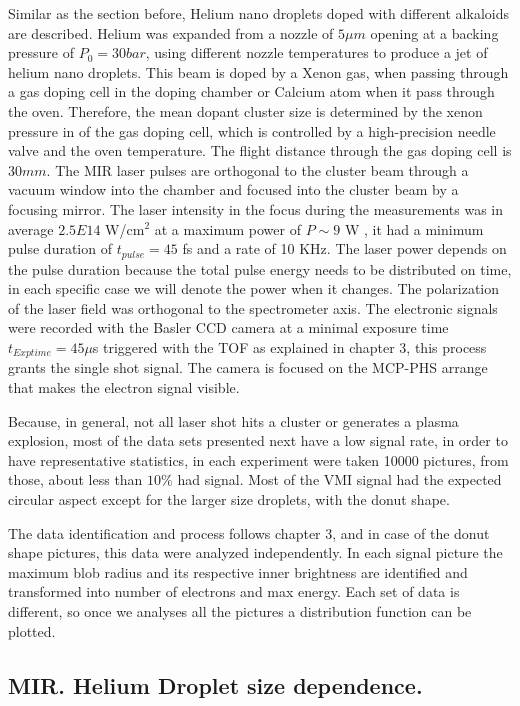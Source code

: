 Similar as the section before, Helium nano droplets doped with different alkaloids are described. Helium was expanded from a nozzle of $5 \mu m$ opening at a backing pressure of $P_{0}=30 bar$, using different nozzle temperatures to produce a jet of helium nano droplets. This beam is doped by a Xenon gas, when passing through a gas doping cell in the doping chamber or Calcium atom when it pass through the oven. Therefore, the mean dopant cluster size is determined by the xenon pressure in of the gas doping cell, which is controlled by a high-precision needle valve and the oven temperature. The flight distance through the gas doping cell is $30mm$. The MIR laser pulses are orthogonal to the cluster beam through a vacuum window into the chamber and focused into the cluster beam by a focusing mirror.
The laser intensity in the focus during the measurements was in average $2.5E14$ W/cm$^{2}$ at a maximum power of $P\sim 9$ W , it had a minimum pulse duration of $t_{pulse}=45$ fs and a rate of 10 KHz. The laser power depends on the pulse duration because the total pulse energy needs to be distributed on time, in each specific case we will denote the power when it changes. The polarization of the laser field was orthogonal to the spectrometer axis. The electronic signals were recorded with the Basler CCD camera at a minimal exposure time $t_{Exp time}=45 \mu$s triggered with the TOF as explained in chapter 3, this process grants the single shot signal. The camera is focused on the MCP-PHS arrange that makes the electron signal visible. 


Because, in general, not all laser shot hits a cluster or generates a plasma explosion,  most of the data sets presented next have a low signal rate, in order to have representative statistics, in each experiment were taken 10000 pictures, from those, about less than $10\%$ had signal. Most of the VMI signal had the expected circular aspect except for the larger size droplets, with the donut shape.

The data identification and process follows chapter 3, and in case of the donut shape pictures, this data were analyzed independently. In each signal picture the maximum blob radius and its respective inner brightness are identified and transformed into number of electrons and max energy. Each set of data is different, so once we analyses all the pictures a distribution function can be plotted.

\subsection{MIR. Helium Droplet size dependence.}

